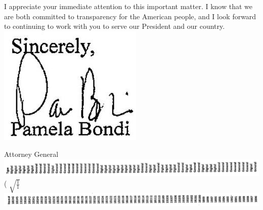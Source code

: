 \documentclass[10pt]{article}
\begin{document}
I appreciate your immediate attention to this important matter. I know that we are both committed to transparency for the American people, and I look forward to continuing to work with you to serve our President and our country.\\
\includegraphics[max width=\textwidth, center]{2025_02_27_dd68c3d38de88f0516d9g-001}

Attorney General\\
\includegraphics[max width=\textwidth, center]{2025_02_27_dd68c3d38de88f0516d9g-002}\\
( \(\sqrt{\frac{1}{1}}\)\\
\includegraphics[max width=\textwidth, center]{2025_02_27_dd68c3d38de88f0516d9g-002(1)}
\end{document}
